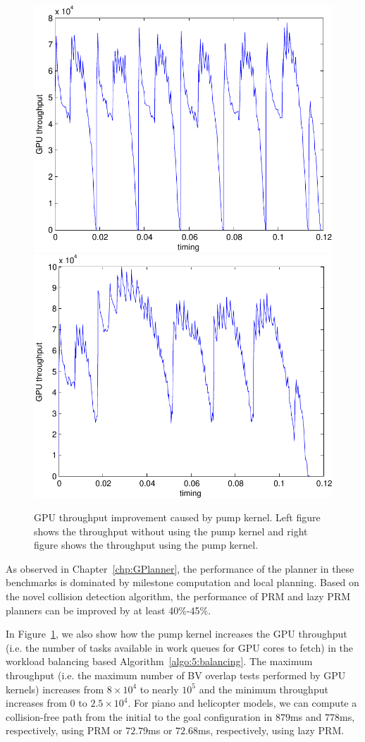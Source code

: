 \begin{figure}[h!]
  \centering
  \includegraphics[width=0.8\linewidth]{figs/5/nopump.pdf}
  \includegraphics[width=0.8\linewidth]{figs/5/pump.pdf}
  \caption[GPU throughput improvement caused by pump kernel]{GPU throughput improvement caused by pump kernel. Left figure shows the throughput without using the pump kernel
  and right figure shows the throughput using the pump kernel.}
  \label{fig:5:pump}
\end{figure}

As observed in Chapter~\ref{chp:GPlanner}, the performance of the planner in these benchmarks is
dominated by milestone computation and local planning. Based on the novel collision detection algorithm, the performance of PRM
and lazy PRM planners can be improved by at least 40\%-45\%.

In Figure~\ref{fig:5:pump}, we also show how the pump kernel increases the GPU throughput (i.e. the number of
tasks available in work queues for GPU cores to fetch) in the workload balancing based Algorithm~\ref{algo:5:balancing}.
The maximum throughput (i.e. the maximum number of BV overlap tests performed by GPU kernels) increases from $8\times 10^4$
to nearly $10^5$ and the minimum throughput increases from $0$ to $2.5\times 10^4$. For piano and helicopter models,
we can compute a collision-free path from the initial to the goal configuration in $879$ms and $778$ms, respectively,
using PRM or $72.79$ms or $72.68$ms, respectively, using lazy PRM.


